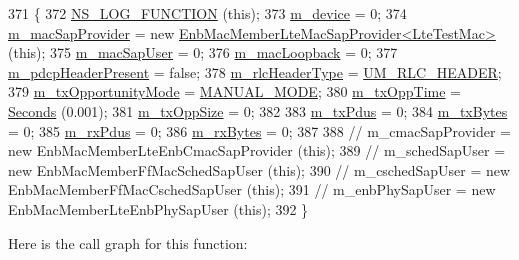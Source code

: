 \begin{DoxyCode}
371 \{
372   \hyperlink{log-macros-disabled_8h_a90b90d5bad1f39cb1b64923ea94c0761}{NS\_LOG\_FUNCTION} (\textcolor{keyword}{this});
373   \hyperlink{classns3_1_1LteTestMac_afec9c26af6d1ac8a9c3d7bf0597425c4}{m\_device} = 0;
374   \hyperlink{classns3_1_1LteTestMac_af089ac1113d0798e1f0d82572e0449b4}{m\_macSapProvider} = \textcolor{keyword}{new} 
      \hyperlink{classns3_1_1LteTestMac_ad3c924cc5faf75c38c868fb9c77a83e1}{EnbMacMemberLteMacSapProvider<LteTestMac>} (\textcolor{keyword}{this});
375   \hyperlink{classns3_1_1LteTestMac_ab7d2f5362a3e07bc7694286b0fe5debd}{m\_macSapUser} = 0;
376   \hyperlink{classns3_1_1LteTestMac_afaba9cd99a3ceaf0bf2a001cbc9138f0}{m\_macLoopback} = 0;
377   \hyperlink{classns3_1_1LteTestMac_a9bcba00d062a466b426c890e7eb24941}{m\_pdcpHeaderPresent} = \textcolor{keyword}{false};
378   \hyperlink{classns3_1_1LteTestMac_acc5726d7fcaab0028ea9fc864468cd9f}{m\_rlcHeaderType} = \hyperlink{classns3_1_1LteTestMac_a1c36ca1572b67fb9614b15fcda18059fa7ef65f6d9cc4e0913fd53f034fe164f2}{UM\_RLC\_HEADER};
379   \hyperlink{classns3_1_1LteTestMac_a1f877e33d19780bf870ba97c296e5b25}{m\_txOpportunityMode} = \hyperlink{classns3_1_1LteTestMac_a03b97b13baf84069540a16a8a217ff64a1722cbe33cb510a866727d37447cba7a}{MANUAL\_MODE};
380   \hyperlink{classns3_1_1LteTestMac_a80a232a577812123507da849b192edb3}{m\_txOppTime} = \hyperlink{group__timecivil_ga33c34b816f8ff6628e33d5c8e9713b9e}{Seconds} (0.001);
381   \hyperlink{classns3_1_1LteTestMac_a358c818a52e4ae246e676b7c4714da7f}{m\_txOppSize} = 0;
382 
383   \hyperlink{classns3_1_1LteTestMac_af389dc31bf05509d27a8314b3dd6b1e1}{m\_txPdus} = 0;
384   \hyperlink{classns3_1_1LteTestMac_afb58baaba2fc9d6108db176c23a0ddfb}{m\_txBytes} = 0;
385   \hyperlink{classns3_1_1LteTestMac_acd1cacbaa7e3b28649ea2cef3f801df2}{m\_rxPdus} = 0;
386   \hyperlink{classns3_1_1LteTestMac_a4ff0ccbe1f5ce36913b89e292c4892da}{m\_rxBytes} = 0;
387 
388 \textcolor{comment}{//   m\_cmacSapProvider = new EnbMacMemberLteEnbCmacSapProvider (this);}
389 \textcolor{comment}{//   m\_schedSapUser = new EnbMacMemberFfMacSchedSapUser (this);}
390 \textcolor{comment}{//   m\_cschedSapUser = new EnbMacMemberFfMacCschedSapUser (this);}
391 \textcolor{comment}{//   m\_enbPhySapUser = new EnbMacMemberLteEnbPhySapUser (this);}
392 \}
\end{DoxyCode}


Here is the call graph for this function\+:


